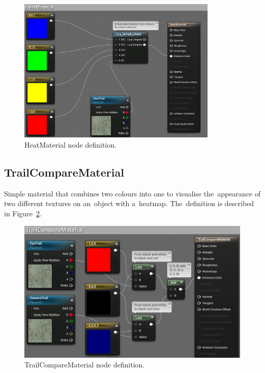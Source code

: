 \begin{figure}[!htb]\centering
    \includegraphics[width=0.85\textwidth]{img/heat-material.png}
    \caption{HeatMaterial node definition.}
    \label{fig:heatmap-material}
\end{figure}


\subsection{TrailCompareMaterial}
\label{sec:trail-compare-implementation}

Simple material that combines two colours into one to visualise the~appearance of two different textures on an~object with a~heatmap. The~definition is described in Figure~\ref{fig:trail-compare}.

\begin{figure}[!ht]\centering
    \includegraphics[width=\textwidth]{img/trail-compare-material.png}
    \caption{TrailCompareMaterial node definition.}
    \label{fig:trail-compare}
\end{figure}

